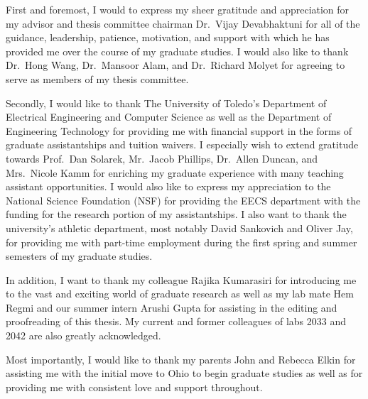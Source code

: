 \documentclass[12pt]{uthesis-v12}  %
\begin{document}
\begin{acknowledgments}
First and foremost, I would to express my sheer gratitude and appreciation for my advisor and thesis committee chairman Dr.~Vijay Devabhaktuni for all of the guidance, leadership, patience, motivation, and support with which he has provided me over the course of my graduate studies. I would also like to thank Dr.~Hong Wang, Dr.~Mansoor Alam, and Dr.~Richard Molyet for agreeing to serve as members of my thesis committee.

Secondly, I would like to thank The University of Toledo's Department of Electrical Engineering and Computer Science as well as the Department of Engineering Technology for providing me with financial support in the forms of graduate assistantships and tuition waivers. I especially wish to extend gratitude towards Prof.~Dan Solarek, Mr.~Jacob Phillips, Dr.~Allen Duncan, and Mrs.~Nicole Kamm for enriching my graduate experience with many teaching assistant opportunities. I would also like to express my appreciation to the National Science Foundation (NSF) for providing the EECS department with the funding for the research portion of my assistantships. I also want to thank the university's athletic department, most notably David Sankovich and Oliver Jay, for providing me with part-time employment during the first spring and summer semesters of my graduate studies.

In addition, I want to thank my colleague Rajika Kumarasiri for introducing me to the vast and exciting world of graduate research as well as my lab mate Hem Regmi and our summer intern Arushi Gupta for assisting in the editing and proofreading of this thesis. My current and former colleagues of labs 2033 and 2042 are also greatly acknowledged.

Most importantly, I would like to thank my parents John and Rebecca Elkin for assisting me with the initial move to Ohio to begin graduate studies as well as for providing me with consistent love and support throughout.
\end{acknowledgments}

\end{document}
